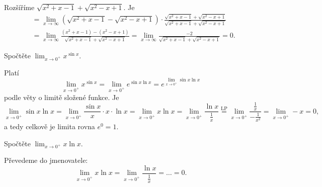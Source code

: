 \begin{reseni}
Rozšíříme $\sqrt{x^2+x-1}+\sqrt{x^2-x+1}$. Je
\begin{align*}
&= \lim_{x\to \infty}\left ( \sqrt{x^2+x-1}-\sqrt{x^2-x+1}   \right ) \cdot \frac{\sqrt{x^2+x-1}+\sqrt{x^2-x+1}}{\sqrt{x^2+x-1}+\sqrt{x^2-x+1}}\\
&= \lim_{x\to \infty} \frac{(x^2+x-1)-(x^2-x+1) }{\sqrt{x^2+x-1}+\sqrt{x^2-x+1}} = \lim_{x\to \infty} \frac{-2}{\sqrt{x^2+x-1}+\sqrt{x^2-x+1}} = 0.
\end{align*}
\end{reseni}

\begin{priklad}
Spočtěte $\lim_{x\to 0^+}x^{\sin x}.$
\end{priklad}

\begin{reseni}
Platí
$$\lim_{x\to 0^+}x^{\sin x}=\lim_{x\to 0^+}e^{\sin x\ln x}=e^{\lim_{x\to 0^+}\sin x\ln x}$$
podle věty o limitě složené funkce. Je
$$
\lim_{x\to 0^+}\sin x\ln x = \lim_{x\to 0^+} \frac{\sin x }{x} \cdot x \cdot \ln x = \lim_{x\to 0^+}x \ln x = \lim_{x\to 0^+}\frac{\ln x }{\frac{1}{x}} \stackrel{\text{LP}}{=} \lim_{x\to 0^+} \frac{\frac{1}{x}}{-\frac{1}{x^2}} = \lim_{x\to 0^+}-x = 0,
$$
a tedy celkově je limita rovna $e^0 = 1$.
\end{reseni}

\begin{priklad}
  Spočtěte $\lim_{x\to 0^+}x\ln x.$
\end{priklad}

\begin{reseni}
  Převedeme do jmenovatele:
  $$\lim_{x\to 0^+}x\ln x=\lim_{x\to 0^+}\frac{\ln x}{\frac{1}{x}} = \dots = 0.$$
\end{reseni}
